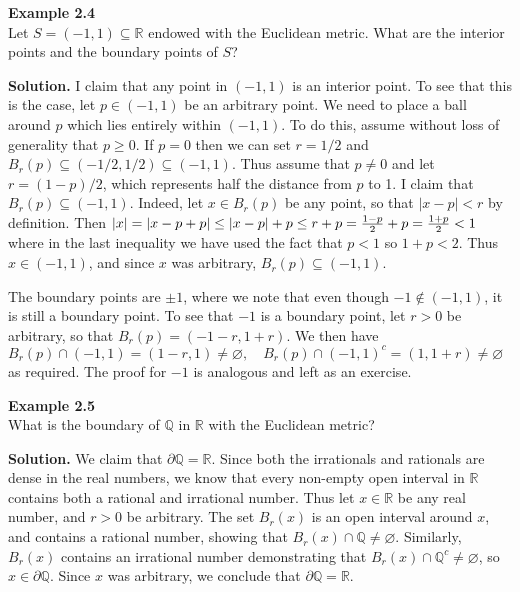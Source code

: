 \documentclass{article}
\theoremstyle{definition}
\numberwithin{equation}{section}
\begin{document}
\begin{myexamplebox}
 \textbf{Example 2.4} \\
 Let $S = (-1,1) \subseteq \mathbb{R}$ endowed with the Euclidean metric. What are the interior points and the boundary points of $S$? \\
 \end{myexamplebox}
 \textbf{Solution.} I claim that any point in $(-1,1)$ is an interior point. To see that this is the case, let $p \in (-1,1)$ be an arbitrary point. We need to place a ball around $p$ which lies entirely within $(-1,1)$. To do this, assume without loss of generality that $p \ge 0$. If $p = 0$ then we can set $r = 1/2$ and $B_r(p) \subseteq (-1/2,1/2) \subseteq (-1,1)$. Thus assume that $p \neq 0$ and let $r = (1-p)/2$, which represents half the distance from $p$ to 1. I claim that $B_r(p) \subseteq (-1,1)$. Indeed, let $x \in B_r(p)$ be any point, so that $|x-p| < r$ by definition. Then 
 $
 |x| = |x - p + p| \leq |x - p| + p \\
 \leq r + p = \frac{1 - p}{2} + p \\
 = \frac{1 + p}{2} < 1
 $
where in the last inequality we have used the fact that $p < 1$ so $1 + p < 2$. Thus $x \in (-1,1)$, and since $x$ was arbitrary, $B_r(p) \subseteq (-1,1)$.

The boundary points are $\pm1$, where we note that even though $-1 \notin (-1,1)$, it is still a boundary point. To see that $-1$ is a boundary point, let $r > 0$ be arbitrary, so that $B_r(p) = (-1-r,1+r)$. We then have 
$ 
B_r(p) \cap (-1,1) = (1 - r, 1) \neq \varnothing, \quad B_r(p) \cap (-1,1)^c = (1,1 + r) \neq \varnothing 
 $ 
as required. The proof for $-1$ is analogous and left as an exercise.

\begin{myexamplebox}
\textbf{Example 2.5} \\
What is the boundary of $\mathbb{Q}$ in $\mathbb{R}$ with the Euclidean metric?\\
\end{myexamplebox}
\textbf{Solution.} We claim that $\partial \mathbb{Q} = \mathbb{R}$. Since both the irrationals and rationals are dense in the real numbers, we know that every non-empty open interval in $\mathbb{R}$ contains both a rational and irrational number. Thus let $x \in \mathbb{R}$ be any real number, and $r > 0$ be arbitrary. The set $B_r(x)$ is an open interval around $x$, and contains a rational number, showing that $B_r(x) \cap \mathbb{Q} \neq \varnothing$. Similarly, $B_r(x)$ contains an irrational number demonstrating that $B_r(x) \cap \mathbb{Q}^c \neq \varnothing$, so $x \in \partial \mathbb{Q}$. Since $x$ was arbitrary, we conclude that $\partial \mathbb{Q} = \mathbb{R}$.
\end{document}

